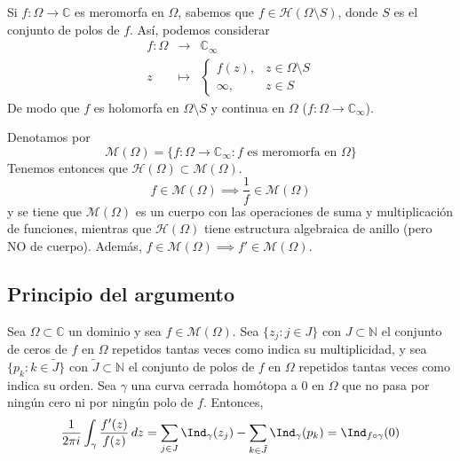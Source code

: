 Si $f : \Omega \to \mathbb{C}$ es meromorfa en $\Omega$, sabemos que $f \in \mathcal{H}(\Omega \setminus S)$, donde $S$ es el conjunto de polos de $f$. Así, podemos considerar
\[
    \begin{matrix}
        f : \Omega &\to & \mathbb{C}_\infty \\
        z &\mapsto & \begin{cases}
            f(z), & z \in \Omega \setminus S \\[6pt]
            \infty, & z \in S
        \end{cases}
    \end{matrix}
\]
De modo que $f$ es holomorfa en $\Omega \setminus S$ y continua en $\Omega$ ($f: \Omega \to \mathbb{C}_\infty$).

Denotamos por
\[
    \mathcal{M}(\Omega) = \{ f : \Omega \to \mathbb{C}_\infty : f \text{ es meromorfa en } \Omega \}
\]
Tenemos entonces que $\mathcal{H}(\Omega) \subset \mathcal{M}(\Omega)$.
\[
    f \in \mathcal{M}(\Omega) \implies \frac{1}{f} \in \mathcal{M}(\Omega)
\]  
y se tiene que $\mathcal{M}(\Omega)$ es un cuerpo con las operaciones de suma y multiplicación de funciones, mientras que $\mathcal{H}(\Omega)$ tiene estructura algebraica de anillo (pero NO de cuerpo). Además, $f \in \mathcal{M}(\Omega) \implies f' \in \mathcal{M}(\Omega)$.

\subsection{Principio del argumento}

\begin{teorema} 
    Sea $\Omega \subset \mathbb{C}$ un dominio y sea $f \in \mathcal{M}(\Omega)$. Sea $\{z_j : j \in J\}$ con $J \subset \mathbb{N}$ el conjunto de ceros de $f$ en $\Omega$ repetidos tantas veces como indica su multiplicidad, y sea $\{p_k : k \in \tilde{J}\}$ con $\tilde{J} \subset \mathbb{N}$ el conjunto de polos de $f$ en $\Omega$ repetidos tantas veces como indica su orden. Sea $\gamma$ una curva cerrada homótopa a $0$ en $\Omega$ que no pasa por ningún cero ni por ningún polo de $f$. Entonces,
    \[
        \frac{1}{2 \pi i} \int_{\gamma} \frac{f'(z)}{f(z)} \, dz = \sum_{j \in J} \Ind_{\gamma}(z_j) - \sum_{k \in \tilde{J}} \Ind_{\gamma}(p_k) = \Ind_{f \circ \gamma}(0)
    \] 
\end{teorema}

